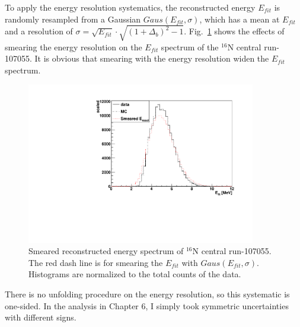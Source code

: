 To apply the energy resolution systematics, the reconstructed energy $E_{fit}$ is randomly resampled from a Gaussian $Gaus(E_{fit},\sigma)$, which has a mean at $E_{fit}$ and a resolution of $\sigma=\sqrt{E_{fit}}\cdot\sqrt{(1+\Delta_{b})^2-1}$. Fig.~\ref{fig:EresolSmear} shows the effects of smearing the energy resolution on the $E_{fit}$ spectrum of the $^{16}$N central run-107055. It is obvious that smearing with the energy resolution widen the $E_{fit}$ spectrum. 
\begin{figure}
	\centering
	\includegraphics[width=10cm]{SmearedEresol_N16.pdf}
	\caption[Smeared reconstructed energy spectrum of $^{16}$N central run-107055.]{Smeared reconstructed energy spectrum of $^{16}$N central run-107055. The red dash line is for smearing the $E_{fit}$ with $Gaus(E_{fit},\sigma)$. Histograms are normalized to the total counts of the data.}
	\label{fig:EresolSmear}
\end{figure}

There is no unfolding procedure on the energy resolution, so this systematic is one-sided\cite{marzec2019measurement}. In the analysis in Chapter 6, I simply took symmetric uncertainties with different signs.

%
%

